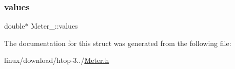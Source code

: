 \mbox{\label{structMeter___a2242de0dc6ce06dd9143a14adcb47ecf}} 
\subsubsection{\texorpdfstring{values}{values}}
{\footnotesize\ttfamily double$\ast$ Meter\+\_\+\+::values}



The documentation for this struct was generated from the following file\+:\begin{DoxyCompactItemize}
\item 
linux/download/htop-\/3../\hyperlink{Meter_8h}{Meter.\+h}\end{DoxyCompactItemize}
